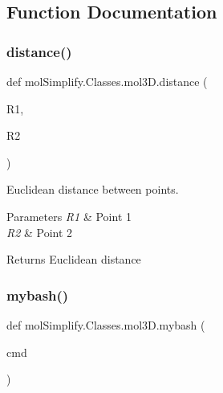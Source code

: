\subsection{Function Documentation}
\mbox{\label{namespacemolSimplify_1_1Classes_1_1mol3D_a517d7e895fbb12b1047664977f0e7113}} 
\subsubsection{\texorpdfstring{distance()}{distance()}}
{\footnotesize\ttfamily def mol\+Simplify.\+Classes.\+mol3\+D.\+distance (\begin{DoxyParamCaption}\item[{}]{R1,  }\item[{}]{R2 }\end{DoxyParamCaption})}



Euclidean distance between points. 


\begin{DoxyParams}{Parameters}
{\em R1} & Point 1 \\
\hline
{\em R2} & Point 2 \\
\hline
\end{DoxyParams}
\begin{DoxyReturn}{Returns}
Euclidean distance 
\end{DoxyReturn}
\mbox{\label{namespacemolSimplify_1_1Classes_1_1mol3D_ac1fc503c0bd616235eeb5b74a5caeb3e}} 
\subsubsection{\texorpdfstring{mybash()}{mybash()}}
{\footnotesize\ttfamily def mol\+Simplify.\+Classes.\+mol3\+D.\+mybash (\begin{DoxyParamCaption}\item[{}]{cmd }\end{DoxyParamCaption})}



